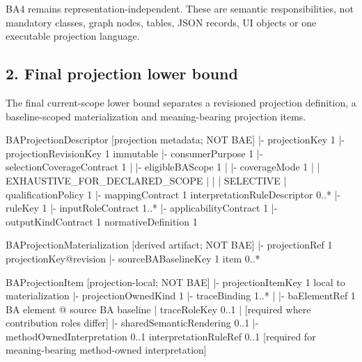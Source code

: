\documentclass[
  11pt,
  a4paper,
]{article}
\newenvironment{Shaded}{}{}
\newcommand{\NormalTok}[1]{#1}
\begin{document}
BA4 remains representation-independent. These are semantic
responsibilities, not mandatory classes, graph nodes, tables, JSON
records, UI objects or one executable projection language.

\subsection{2. Final projection lower
bound}\label{final-projection-lower-bound}

The final current-scope lower bound separates a revisioned projection
definition, a baseline-scoped materialization and meaning-bearing
projection items.

\begin{Shaded}
\begin{Highlighting}[]
\NormalTok{BAProjectionDescriptor                         [projection metadata; NOT BAE]}
\NormalTok{|{-} projectionKey                         1}
\NormalTok{|{-} projectionRevisionKey                 1 immutable}
\NormalTok{|{-} consumerPurpose                       1}
\NormalTok{|{-} selectionCoverageContract             1}
\NormalTok{|    |{-} eligibleBAScope                  1}
\NormalTok{|    |{-} coverageMode                     1}
\NormalTok{|    |    EXHAUSTIVE\_FOR\_DECLARED\_SCOPE}
\NormalTok{|    |    | SELECTIVE}
\NormalTok{|    \textasciigrave{}{-} qualificationPolicy              1}
\NormalTok{|{-} mappingContract                       1}
\NormalTok{\textasciigrave{}{-} interpretationRuleDescriptor          0..*}
\NormalTok{     |{-} ruleKey                          1}
\NormalTok{     |{-} inputRoleContract                1..*}
\NormalTok{     |{-} applicabilityContract            1}
\NormalTok{     |{-} outputKindContract               1}
\NormalTok{     \textasciigrave{}{-} normativeDefinition              1}

\NormalTok{BAProjectionMaterialization                    [derived artifact; NOT BAE]}
\NormalTok{|{-} projectionRef                         1 projectionKey@revision}
\NormalTok{|{-} sourceBABaselineKey                   1}
\NormalTok{\textasciigrave{}{-} item                                  0..*}

\NormalTok{BAProjectionItem                               [projection{-}local; NOT BAE]}
\NormalTok{|{-} projectionItemKey                     1 local to materialization}
\NormalTok{|{-} projectionOwnedKind                   1}
\NormalTok{|{-} traceBinding                           1..*}
\NormalTok{|    |{-} baElementRef                      1 BA element @ source BA baseline}
\NormalTok{|    \textasciigrave{}{-} traceRoleKey                      0..1}
\NormalTok{|         [required where contribution roles differ]}
\NormalTok{|{-} sharedSemanticRendering               0..1}
\NormalTok{|{-} methodOwnedInterpretation             0..1}
\NormalTok{\textasciigrave{}{-} interpretationRuleRef                 0..1}
\NormalTok{     [required for meaning{-}bearing method{-}owned interpretation]}
\end{Highlighting}
\end{Shaded}
\end{document}
